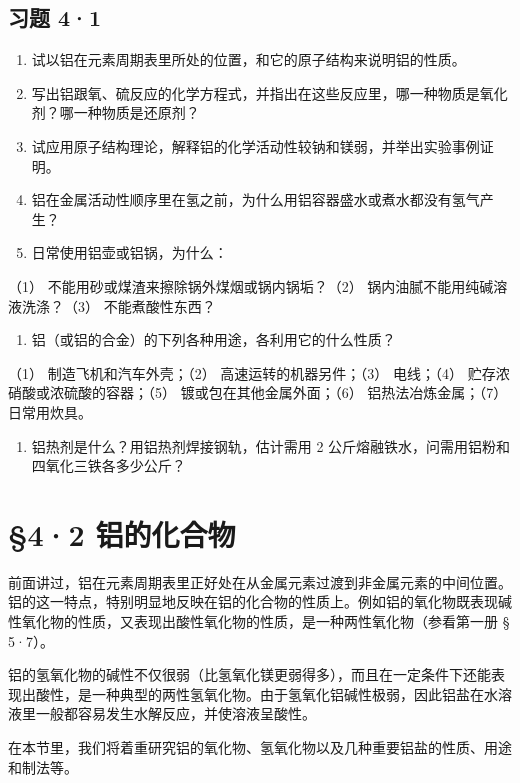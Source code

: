 \subsection{习题 4·1}

\begin{enumerate}
\item
  试以铝在元素周期表里所处的位置，和它的原子结构来说明铝的性质。
\item
  写出铝跟氧、硫反应的化学方程式，并指出在这些反应里，哪一种物质是氧化剂？哪一种物质是还原剂？
\item
  试应用原子结构理论，解释铝的化学活动性较钠和镁弱，并举出实验事例证明。
\item
  铝在金属活动性顺序里在氢之前，为什么用铝容器盛水或煮水都没有氢气产生？
\item
  日常使用铝壶或铝锅，为什么：
\end{enumerate}

（1） 不能用砂或煤渣来擦除锅外煤烟或锅内锅垢？（2）
锅内油腻不能用纯碱溶液洗涤？（3） 不能煮酸性东西？

\begin{enumerate}[start=6]
\item
  铝（或铝的合金）的下列各种用途，各利用它的什么性质？
\end{enumerate}

（1） 制造飞机和汽车外壳；（2） 高速运转的机器另件；（3） 电线；（4）
贮存浓硝酸或浓硫酸的容器；（5） 镀或包在其他金属外面；（6）
铝热法冶炼金属；（7） 日常用炊具。

\begin{enumerate}[start=7]
\item
  铝热剂是什么？用铝热剂焊接钢轨，估计需用 2
  公斤熔融铁水，问需用铝粉和四氧化三铁各多少公斤？
\end{enumerate}

\section{§4·2 铝的化合物}

前面讲过，铝在元素周期表里正好处在从金属元素过渡到非金属元素的中间位置。铝的这一特点，特别明显地反映在铝的化合物的性质上。例如铝的氧化物既表现碱性氧化物的性质，又表现出酸性氧化物的性质，是一种两性氧化物（参看第一册
§ 5·7）。

铝的氢氧化物的碱性不仅很弱（比氢氧化镁更弱得多），而且在一定条件下还能表现出酸性，是一种典型的两性氢氧化物。由于氢氧化铝碱性极弱，因此铝盐在水溶液里一般都容易发生水解反应，并使溶液呈酸性。

在本节里，我们将着重研究铝的氧化物、氢氧化物以及几种重要铝盐的性质、用途和制法等。

